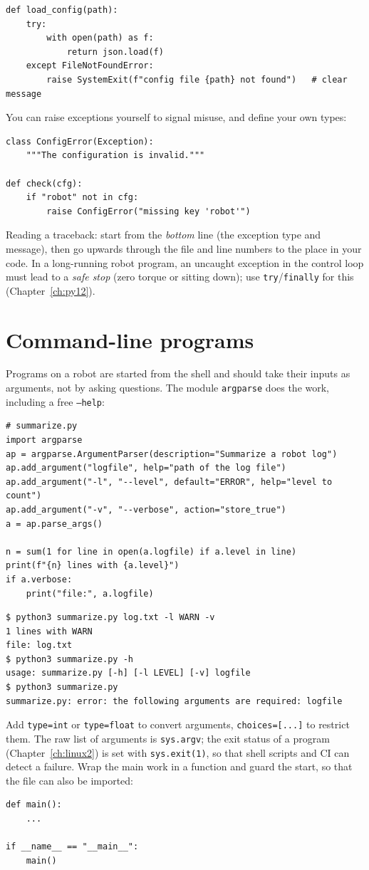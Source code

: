 \begin{verbatim}
def load_config(path):
    try:
        with open(path) as f:
            return json.load(f)
    except FileNotFoundError:
        raise SystemExit(f"config file {path} not found")   # clear message
\end{verbatim}
You can raise exceptions yourself to signal misuse, and define your own types:
\begin{verbatim}
class ConfigError(Exception):
    """The configuration is invalid."""

def check(cfg):
    if "robot" not in cfg:
        raise ConfigError("missing key 'robot'")
\end{verbatim}
Reading a traceback: start from the \emph{bottom} line (the exception type and message), then go upwards through the file and line numbers to the place in your code. In a long-running robot program, an uncaught exception in the control loop must lead to a \emph{safe stop} (zero torque or sitting down); use \texttt{try}/\texttt{finally} for this (Chapter~\ref{ch:py12}).

\section*{Command-line programs}
Programs on a robot are started from the shell and should take their inputs as arguments, not by asking questions. The module \texttt{argparse} does the work, including a free \texttt{--help}:
\begin{verbatim}
# summarize.py
import argparse
ap = argparse.ArgumentParser(description="Summarize a robot log")
ap.add_argument("logfile", help="path of the log file")
ap.add_argument("-l", "--level", default="ERROR", help="level to count")
ap.add_argument("-v", "--verbose", action="store_true")
a = ap.parse_args()

n = sum(1 for line in open(a.logfile) if a.level in line)
print(f"{n} lines with {a.level}")
if a.verbose:
    print("file:", a.logfile)
\end{verbatim}
\begin{verbatim}
$ python3 summarize.py log.txt -l WARN -v
1 lines with WARN
file: log.txt
$ python3 summarize.py -h
usage: summarize.py [-h] [-l LEVEL] [-v] logfile
$ python3 summarize.py
summarize.py: error: the following arguments are required: logfile
\end{verbatim}
Add \texttt{type=int} or \texttt{type=float} to convert arguments, \texttt{choices=[...]} to restrict them. The raw list of arguments is \texttt{sys.argv}; the exit status of a program (Chapter~\ref{ch:linux2}) is set with \verb!sys.exit(1)!, so that shell scripts and CI can detect a failure. Wrap the main work in a function and guard the start, so that the file can also be imported:
\begin{verbatim}
def main():
    ...

if __name__ == "__main__":
    main()
\end{verbatim}

